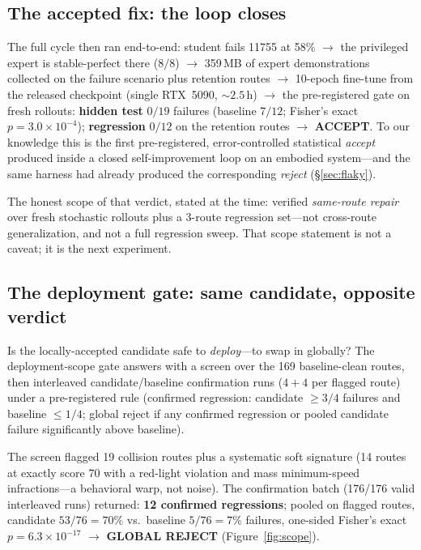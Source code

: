 \documentclass{article}
\begin{document}
\subsection{The accepted fix: the loop closes}
\label{sec:acceptedfix}

The full cycle then ran end-to-end: student fails 11755 at 58\% $\rightarrow$ the privileged expert is
stable-perfect there ($8/8$) $\rightarrow$ 359\,MB of expert demonstrations collected on the failure
scenario plus retention routes $\rightarrow$ 10-epoch fine-tune from the released checkpoint (single
RTX~5090, ${\sim}2.5$\,h) $\rightarrow$ the pre-registered gate on fresh rollouts:
\textbf{hidden test} $0/19$ failures (baseline $7/12$; Fisher's exact $p = 3.0\times10^{-4}$);
\textbf{regression} $0/12$ on the retention routes $\rightarrow$ \textbf{ACCEPT}. To our knowledge this
is the first pre-registered, error-controlled statistical \emph{accept} produced inside a closed
self-improvement loop on an embodied system---and the same harness had already produced the
corresponding \emph{reject} (\S\ref{sec:flaky}).

The honest scope of that verdict, stated at the time: verified \emph{same-route repair} over fresh
stochastic rollouts plus a 3-route regression set---not cross-route generalization, and not a full
regression sweep. That scope statement is not a caveat; it is the next experiment.

\subsection{The deployment gate: same candidate, opposite verdict}
\label{sec:scope}

Is the locally-accepted candidate safe to \emph{deploy}---to swap in globally? The deployment-scope
gate answers with a screen over the 169 baseline-clean routes, then interleaved candidate/baseline
confirmation runs ($4{+}4$ per flagged route) under a pre-registered rule (confirmed regression:
candidate $\ge 3/4$ failures and baseline $\le 1/4$; global reject if any confirmed regression or pooled
candidate failure significantly above baseline).

The screen flagged 19 collision routes plus a systematic soft signature (14 routes at exactly score 70
with a red-light violation and mass minimum-speed infractions---a behavioral warp, not noise). The
confirmation batch (176/176 valid interleaved runs) returned:
\textbf{12 confirmed regressions}; pooled on flagged routes, candidate $53/76 = 70\%$ vs.\ baseline
$5/76 = 7\%$ failures, one-sided Fisher's exact $p = 6.3\times10^{-17}$ $\rightarrow$ \textbf{GLOBAL REJECT}
(Figure~\ref{fig:scope}).
\end{document}
